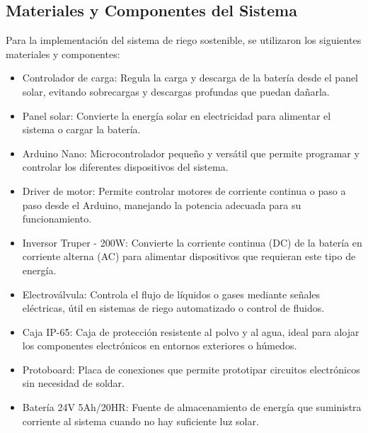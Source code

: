 \documentclass[12pt]{article}
\begin{document}
\subsection*{Materiales y Componentes del Sistema}
Para la implementación del sistema de riego sostenible, se utilizaron los siguientes materiales y componentes:
\begin{itemize}
      \item Controlador de carga: Regula la carga y descarga de la batería desde el panel solar, evitando sobrecargas y descargas profundas que puedan dañarla.
      \item Panel solar: Convierte la energía solar en electricidad para alimentar el sistema o cargar la batería.
      \item Arduino Nano: Microcontrolador pequeño y versátil que permite programar y controlar los diferentes dispositivos del sistema.
      \item Driver de motor: Permite controlar motores de corriente continua o paso a paso desde el Arduino, manejando la potencia adecuada para su funcionamiento.
      \item Inversor Truper - 200W: Convierte la corriente continua (DC) de la batería en corriente alterna (AC) para alimentar dispositivos que requieran este tipo de energía.
      \item Electroválvula: Controla el flujo de líquidos o gases mediante señales eléctricas, útil en sistemas de riego automatizado o control de fluidos.
      \item Caja IP-65: Caja de protección resistente al polvo y al agua, ideal para alojar los componentes electrónicos en entornos exteriores o húmedos.
      \item Protoboard: Placa de conexiones que permite prototipar circuitos electrónicos sin necesidad de soldar.
      \item Batería 24V 5Ah/20HR: Fuente de almacenamiento de energía que suministra corriente al sistema cuando no hay suficiente luz solar.
\end{itemize}
\end{document}
